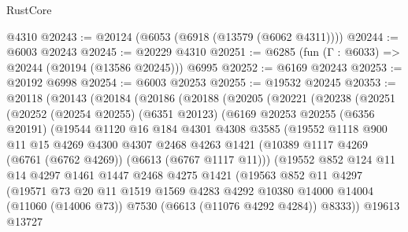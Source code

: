 \begin{lexlean}{RustCore}
\begin{coremodule}
    @4310
@20243 := @20124 (@6053 (@6918 (@13579 (@6062 @4311))))
@20244 := @6003 @20243
@20245 := @20229 @4310
@20251 := @6285 (fun (Γ : @6033) => @20244 (@20194 (@13586 @20245))) @6995
@20252 := @6169 @20243
@20253 := @20192 @6998
@20254 := @6003 @20253
@20255 := @19532 @20245
@20353 := @20118
    (@20143
      (@20184
        (@20186
          (@20188
            (@20205
              (@20221
                (@20238
                  (@20251
                    (@20252
                      (@20254 @20255)
                      (@6351 @20123)
                      (@6169
                        @20253
                        @20255
                        (@6356 @20191)
                        (@19544
                          @1120
                          @16
                          @184
                          @4301
                          @4308
                          @3585
                          (@19552
                            @1118
                            @900
                            @11
                            @15
                            @4269
                            @4300
                            @4307
                            @2468
                            @4263
                            @1421
                            (@10389 @1117 @4269 (@6761 (@6762 @4269)) (@6613 (@6767 @1117 @11)))
                            (@19552
                              @852
                              @124
                              @11
                              @14
                              @4297
                              @1461
                              @1447
                              @2468
                              @4275
                              @1421
                              (@19563
                                @852
                                @11
                                @4297
                                (@19571
                                  @73
                                  @20
                                  @11
                                  @1519
                                  @1569
                                  @4283
                                  @4292
                                  @10380
                                  @14000
                                  @14004
                                  (@11060 (@14006 @73))
                                  @7530
                                  (@6613 (@11076 @4292 @4284))
                                  @8333))
                              @19613
                              @13727

\end{coremodule}
\end{lexlean}
